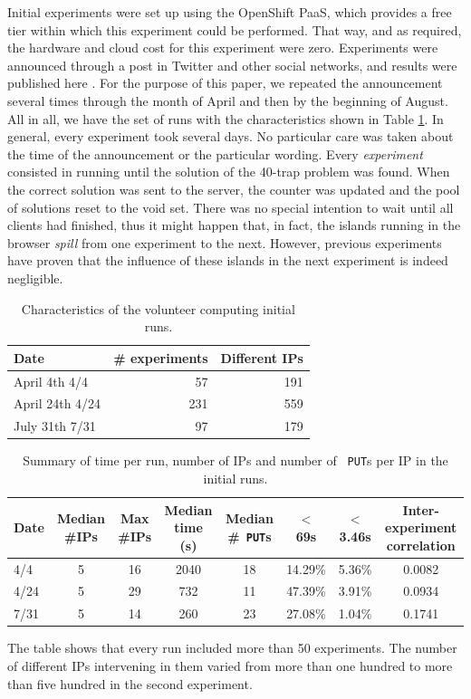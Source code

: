 \documentclass[journal,onecolumn]{IEEEtran}
\begin{document}
Initial experiments were set up using the OpenShift
PaaS, which provides a free tier within which this 
experiment could be performed. That way, and as required, the hardware
and cloud cost for this experiment were zero. Experiments were
announced through a post in Twitter and other social networks, and
results were published here \cite{DBLP:conf/gecco/GuervosG15}. For the
purpose of this paper, we repeated the announcement several times
through the month of April and then by the beginning of August. All
in all, we have the set of runs with the characteristics shown in
Table \ref{tab:runs}. In general, every experiment took several
days. No particular care was taken about the time of the announcement
or the particular wording. Every {\em experiment} consisted in running
until the solution of the 40-trap problem was found. When the correct
solution was sent to the server, the counter was updated and the pool
of solutions reset to the void set. There was no special intention to wait
until all clients had finished, thus it might happen that, in fact,
the islands running in the browser {\em spill} from one experiment to
the next. However, previous experiments have proven that the influence
of these islands in the next experiment is indeed negligible.
%
\begin{table}
\caption{Characteristics of the volunteer computing initial runs. \label{tab:runs}}
\begin{center}
\begin{tabular}{l|rr}
\hline
Date & \# experiments & Different IPs \\
\hline
April 4th 4/4 & 57 & 191 \\
April 24th 4/24 &  231 & 559 \\
July 31th 7/31 & 97 & 179 \\
\hline
\end{tabular}
\end{center}
\end{table}
%
\begin{table}
\caption{Summary of time per run, number of IPs and number of {\tt
    PUT}s per IP in the initial runs. \label{tab:summary:os}}
\begin{center}
\begin{tabular}{l|ccccccc}
\hline
Date & Median \#IPs & Max \#IPs & Median time (s) & Median \#{\tt
  PUT}s & $<$ 69s & $<$ 3.46s & Inter-experiment correlation\\
\hline
4/4 & 5 & 16 & 2040 & 18 & 14.29\% & 5.36\% & 0.0082 \\
4/24 &  5 & 29 & 732 & 11 & 47.39\% & 3.91\% & 0.0934\\
7/31 & 5 & 14 & 260 & 23 & 27.08\% & 1.04\%  & 0.1741\\
\hline
\end{tabular}
\end{center}
\end{table}
%
The table shows that every run included more than 50 experiments. The
number of different IPs intervening in them varied from more than one
hundred to more than five hundred in the second experiment.
\end{document}
